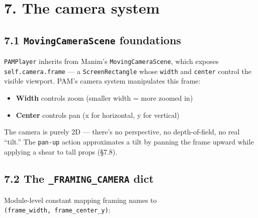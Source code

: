 \documentclass[
  12pt,
  letterpaper,
]{book}
\providecommand{\tightlist}{%
  \setlength{\itemsep}{0pt}\setlength{\parskip}{0pt}}
\begin{document}
\section{7. The camera system}\label{the-camera-system}

\subsection{\texorpdfstring{7.1 \texttt{MovingCameraScene}
foundations}{7.1 MovingCameraScene foundations}}\label{movingcamerascene-foundations}

\texttt{PAMPlayer} inherits from Manim's \texttt{MovingCameraScene},
which exposes \texttt{self.camera.frame} --- a \texttt{ScreenRectangle}
whose \texttt{width} and \texttt{center} control the visible viewport.
PAM's camera system manipulates this frame:

\begin{itemize}
\tightlist
\item
  \textbf{Width} controls zoom (smaller width = more zoomed in)
\item
  \textbf{Center} controls pan (x for horizontal, y for vertical)
\end{itemize}

The camera is purely 2D --- there's no perspective, no depth-of-field,
no real ``tilt.'' The \texttt{pan-up} action approximates a tilt by
panning the frame upward while applying a shear to tall props (§7.8).

\subsection{\texorpdfstring{7.2 The \texttt{\_FRAMING\_CAMERA}
dict}{7.2 The \_FRAMING\_CAMERA dict}}\label{the-_framing_camera-dict}

Module-level constant mapping framing names to
\texttt{(frame\_width,\ frame\_center\_y)}:
\end{document}
